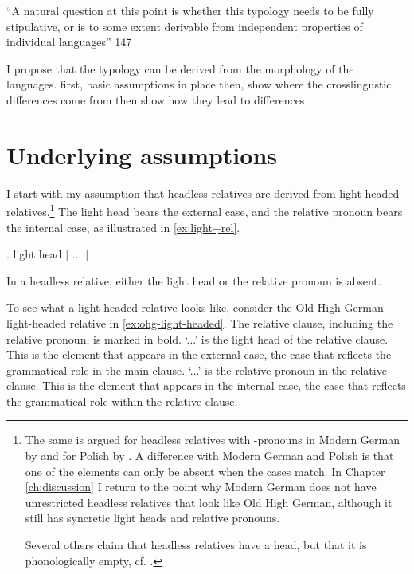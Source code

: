 ``A natural question at this point is whether this typology needs to be fully stipulative, or is to some extent derivable from independent properties of individual languages'' \citet{grosu1994}{147}

I propose that the typology can be derived from the morphology of the languages.
first, basic assumptions in place
then, show where the crosslingustic differences come from
then show how they lead to differences

\section{Underlying assumptions}\label{sec:assumptions}

I start with my assumption that headless relatives are derived from light-headed relatives.\footnote{
The same is argued for headless relatives with -pronouns in Modern German by \citealt{fuss2014,hanink2018} and for Polish by \citealt{citko2004}.
A difference with Modern German and Polish is that one of the elements can only be absent when the cases match. In Chapter \ref{ch:discussion} I return to the point why Modern German does not have unrestricted headless relatives that look like Old High German, although it still has syncretic light heads and relative pronouns.

Several others claim that headless relatives have a head, but that it is phonologically empty, cf. \citealt{bresnan1978,groos1981,himmelreich2017}.
}
The light head bears the external case, and the relative pronoun bears the internal case, as illustrated in \ref{ex:light+rel}.

\ex. light head [ ... ]\label{ex:light+rel}

In a headless relative, either the light head or the relative pronoun is absent.

To see what a light-headed relative looks like, consider the Old High German light-headed relative in \ref{ex:ohg-light-headed}. The relative clause, including the relative pronoun, is marked in bold.
 `...' is the light head of the relative clause. This is the element that appears in the external case, the case that reflects the grammatical role in the main clause.
 `...' is the relative pronoun in the relative clause. This is the element that appears in the internal case, the case that reflects the grammatical role within the relative clause.

